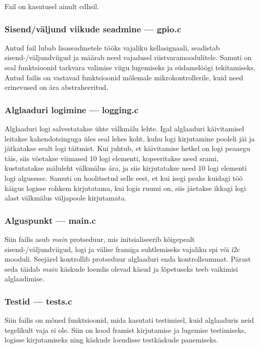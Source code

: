 \documentclass[12pt,a4paper]{article}
\begin{document}
Fail on kasutusel ainult \gls{cdhs}il.

\subsubsection{Sisend/väljund viikude seadmine --- \textbf{gpio.c}}
Antud fail lubab lisaseadmetele tööks vajaliku kellasignaali, seadistab
sisend-/väljundviigud ja määrab need vajadusel riistvaramoodulitele. Samuti on
seal funktsioonid tarkvara valimise viigu lugemiseks ja südamelöögi
tekitamiseks. Antud failis on vastavad funktsioonid mõlemale mikrokontrollerile,
kuid need erinevused on ära abstraheeritud.

\subsubsection{Alglaaduri logimine --- \textbf{logging.c}}
Alglaaduri logi salvestatakse ühte välkmälu lehte. Igal alglaaduri käivitamisel
leitakse kahendotsinguga üles seal lehes koht, kuhu logi kirjutamine pooleli jäi
ja jätkatakse sealt logi täitmist. Kui juhtub, et käivitamise hetkel on logi
peaaegu täis, siis võetakse viimased 10 logi elementi, kopeeritakse need
\gls{sram}i, kustutatakse mäluleht välkmälus ära, ja siis kirjutatakse need 10
logi elementi logi algusesse. Samuti on hoolitsetud selle eest, et kui isegi
peaks kuidagi töö käigus logisse rohkem kirjutatama, kui logis ruumi on, siis
jäetakse ikkagi logi alast välkmälus väljapoole kirjutamata.

\subsubsection{Alguspunkt --- \textbf{main.c}}
Siin failis asub \textit{main} protseduur, mis initsialiseerib kõigepealt
sisend-/väljundviigud, logi ja välise \gls{fram}iga suhtlemiseks vajaliku
\gls{spi} või \gls{i2c} mooduli. Seejärel kontrollib protseduur alglaaduri enda
kontrollsummat. Pärast seda täidab \textit{main} käskude loendis olevad käsud ja
lõpetuseks teeb vaikimisi alglaadimise.

\subsubsection{Testid --- \textbf{tests.c}}
Siin failis on mõned funktsioonid, mida kasutati testimisel, kuid alglaaduris
neid tegelikult vaja ei ole. Siin on kood \gls{fram}ist kirjutamise ja lugemise
testimiseks, logisse kirjutamiseks ning käskude loendisse testkäskude
panemiseks.
\end{document}
